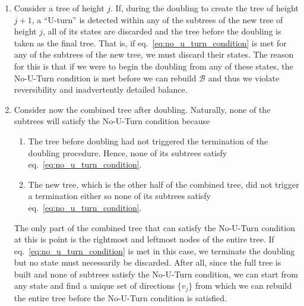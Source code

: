 \begin{enumerate}
    \item Consider a tree of height $j$. If, during the doubling to create the tree of height $j + 1$, a ``U-turn'' is detected within any of the subtrees of the new tree of height $j$, all of its states are discarded and the tree before the doubling is taken as the final tree. That is, if eq.~\eqref{eq:no_u_turn_condition} is met for any of the subtrees of the new tree, we must discard their states. The reason for this is that if we were to begin the doubling from any of these states, the No-U-Turn condition is met before we can rebuild $\mathcal{B}$ and thus we violate reversibility and inadvertently detailed balance.
    \item Consider now the combined tree after doubling. Naturally, none of the subtrees will satisfy the No-U-Turn condition because
    \begin{enumerate}
        \item The tree before doubling had not triggered the termination of the doubling procedure. Hence, none of its subtrees satisfy eq.~\eqref{eq:no_u_turn_condition}. 
        \item The new tree, which is the other half of the combined tree, did not trigger a termination either so none of its subtrees satisfy eq.~\eqref{eq:no_u_turn_condition}.
    \end{enumerate}
    The only part of the combined tree that can satisfy the No-U-Turn condition at this is point is the rightmost and leftmost nodes of the entire tree. If eq.~\eqref{eq:no_u_turn_condition} is met in this case, we terminate the doubling but no state must necessarily be discarded. After all, since the full tree is built and none of subtrees satisfy the No-U-Turn condition, we can start from any state and find a unique set of directions $\{v_j\}$ from which we can rebuild the entire tree before the No-U-Turn condition is satisfied.
\end{enumerate}

